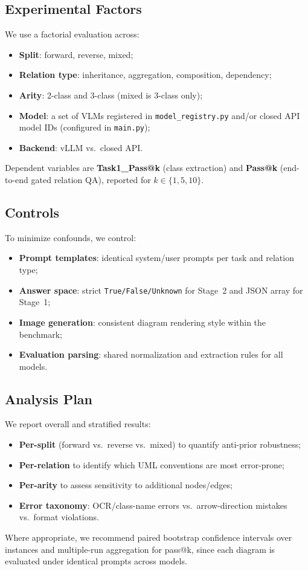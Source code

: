 \documentclass[11pt]{article}
\begin{document}
\subsection{Experimental Factors}
\label{sec:factors}
We use a factorial evaluation across:
\begin{itemize}[leftmargin=*, itemsep=0.25em]
  \item \textbf{Split}: forward, reverse, mixed;
  \item \textbf{Relation type}: inheritance, aggregation, composition, dependency;
  \item \textbf{Arity}: 2-class and 3-class (mixed is 3-class only);
  \item \textbf{Model}: a set of VLMs registered in \texttt{model\_registry.py} and/or closed API model IDs (configured in \texttt{main.py});
  \item \textbf{Backend}: vLLM vs.\ closed API.
\end{itemize}
Dependent variables are \textbf{Task1\_Pass@k} (class extraction) and \textbf{Pass@k} (end-to-end gated relation QA), reported for $k \in \{1,5,10\}$.

\subsection{Controls}
\label{sec:controls}
To minimize confounds, we control:
\begin{itemize}[leftmargin=*, itemsep=0.25em]
  \item \textbf{Prompt templates}: identical system/user prompts per task and relation type;
  \item \textbf{Answer space}: strict \texttt{True/False/Unknown} for Stage~2 and JSON array for Stage~1;
  \item \textbf{Image generation}: consistent diagram rendering style within the benchmark;
  \item \textbf{Evaluation parsing}: shared normalization and extraction rules for all models.
\end{itemize}

\subsection{Analysis Plan}
\label{sec:analysis}
We report overall and stratified results:
\begin{itemize}[leftmargin=*, itemsep=0.25em]
  \item \textbf{Per-split} (forward vs.\ reverse vs.\ mixed) to quantify anti-prior robustness;
  \item \textbf{Per-relation} to identify which UML conventions are most error-prone;
  \item \textbf{Per-arity} to assess sensitivity to additional nodes/edges;
  \item \textbf{Error taxonomy}: OCR/class-name errors vs.\ arrow-direction mistakes vs.\ format violations.
\end{itemize}
Where appropriate, we recommend paired bootstrap confidence intervals over instances and multiple-run aggregation for pass@k, since each diagram is evaluated under identical prompts across models.
\end{document}

